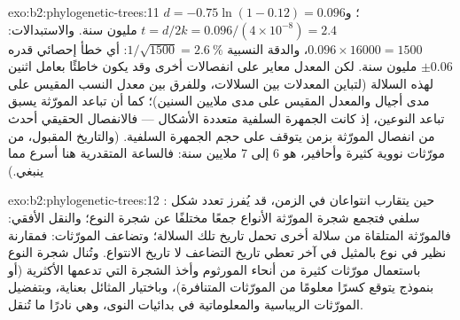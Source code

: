 \begin{solution}{exo:b2:phylogenetic-trees:11}
$d = -0.75\ln(1 - 0.12) = 0.096$؛ و$t = d/2k = 0.096/(4\times 10^{-8})
= 2.4$ مليون سنة. والاستبدالات: $0.096\times \num{16000} =
1500$، والدقة النسبية $1/\sqrt{1500} = \qty{2.6}{\%}$: أي
خطأ إحصائي قدره $\pm 0.06$ مليون سنة. لكن المعدل
معاير على انفصالات أخرى وقد يكون خاطئًا بعامل اثنين
لهذه السلالة (لتباين المعدلات بين السلالات، وللفرق
بين معدل النسب المقيس على مدى أجيال
والمعدل المقيس على مدى ملايين السنين)؛ كما أن تباعد المورّثة
يسبق تباعد النوعين، إذ كانت الجمهرة السلفية
متعددة الأشكال --- فالانفصال الحقيقي أحدث
من انفصال المورّثة بزمن يتوقف على حجم الجمهرة
السلفية. (والتاريخ المقبول، من مورّثات نووية كثيرة
وأحافير، هو 6 إلى 7 ملايين سنة: فالساعة المتقدرية هنا
أسرع مما ينبغي.)
\end{solution}

\begin{solution}{exo:b2:phylogenetic-trees:12}
: حين يتقارب انتواعان في
الزمن، قد يُفرز تعدد شكل سلفي فتجمع شجرة المورّثة
الأنواع جمعًا مختلفًا عن شجرة النوع؛ والنقل
الأفقي: فالمورّثة المتلقاة من سلالة أخرى تحمل تاريخ تلك
السلالة؛ وتضاعف المورّثات: فمقارنة نظير في نوع
بالمثيل في آخر تعطي تاريخ التضاعف
لا تاريخ الانتواع. وتُنال شجرة النوع باستعمال
مورّثات كثيرة من أنحاء المورثوم وأخذ الشجرة التي تدعمها
الأكثرية (أو بنموذج يتوقع كسرًا معلومًا من المورّثات المتنافرة)،
وباختيار المثائل بعناية، وبتفضيل المورّثات
الريباسية والمعلوماتية في بدائيات النوى، وهي نادرًا ما تُنقل.
\end{solution}

